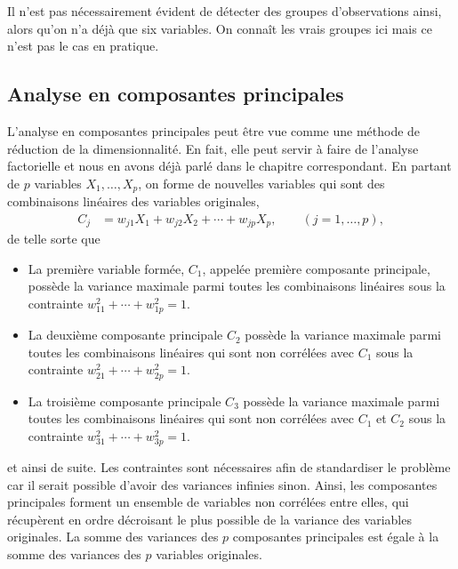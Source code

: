 \documentclass[
  11pt,
  letterpaper,
]{book}
\providecommand{\tightlist}{%
  \setlength{\itemsep}{0pt}\setlength{\parskip}{0pt}}
\theoremstyle{definition}
\theoremstyle{definition}
\theoremstyle{definition}
\theoremstyle{remark}
\begin{document}
Il n'est pas nécessairement évident de détecter des groupes d'observations ainsi, alors qu'on n'a déjà que six variables. On connaît les vrais groupes ici mais ce n'est pas le cas en pratique.

\hypertarget{analyse-en-composantes-principales}{%
\subsection{Analyse en composantes principales}\label{analyse-en-composantes-principales}}

L'analyse en composantes principales peut être vue comme une méthode de réduction de la dimensionnalité. En fait, elle peut servir à faire de l'analyse factorielle et nous en avons déjà parlé dans le chapitre correspondant. En partant de \(p\) variables \(X_1, \ldots, X_p\), on forme de nouvelles variables qui sont des combinaisons linéaires des variables originales,
\begin{align*}
C_j &= w_{j1} X_1 + w_{j2} X_2 + \cdots + w_{jp} X_p, \qquad (j=1, \ldots, p),
\end{align*}
de telle sorte que

\begin{itemize}
\tightlist
\item
  La première variable formée, \(C_1\), appelée première composante principale, possède la variance maximale parmi toutes les combinaisons linéaires sous la contrainte \(w_{11}^2 + \cdots + w_{1p}^2=1\).
\item
  La deuxième composante principale \(C_2\) possède la variance maximale parmi toutes les combinaisons linéaires qui sont non corrélées avec \(C_1\) sous la contrainte \(w_{21}^2 + \cdots + w_{2p}^2=1\).
\item
  La troisième composante principale \(C_3\) possède la variance maximale parmi toutes les combinaisons linéaires qui sont non corrélées avec \(C_1\) et \(C_2\) sous la contrainte \(w_{31}^2 + \cdots + w_{3p}^2=1\).
\end{itemize}

et ainsi de suite. Les contraintes sont nécessaires afin de standardiser le problème car il serait possible d'avoir des variances infinies sinon. Ainsi, les composantes principales forment un ensemble de variables non corrélées entre elles, qui récupèrent en ordre décroisant le plus possible de la variance des variables originales. La somme des variances des \(p\) composantes principales est égale à la somme des variances des \(p\) variables originales.
\end{document}
